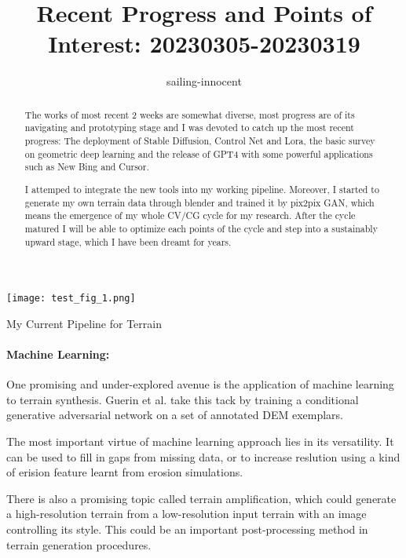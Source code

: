 \documentclass[sigconf]{acmart/acmart}
\begin{document}
\title{Recent Progress and Points of Interest: 20230305-20230319}
\author{sailing-innocent}


\begin{abstract}
    The works of most recent 2 weeks are somewhat diverse,
    most progress are of its navigating and prototyping stage and
    I was devoted to catch up the most recent progress:
    The deployment of Stable Diffusion, Control Net and Lora,
    the basic survey on geometric deep learning and
    the release of GPT4 with some powerful applications
    such as New Bing and Cursor.

    I attemped to integrate the new tools into my working pipeline.
    Moreover, I started to generate my own terrain data through blender
    and trained it by pix2pix GAN, which means the emergence of my whole
    CV/CG cycle for my research.
    After the cycle matured I will be able to optimize each points
    of the cycle and step into a sustainably upward stage,
    which I have been dreamt for years.
\end{abstract}

\begin{teaserfigure}
    \texttt{[image: test\_fig\_1.png]}
    \caption{My Current Pipeline for Terrain }
    \label{fig:teaser}
\end{teaserfigure}

\maketitle

\paragraph{Machine Learning:}

One promising and under-explored avenue is the application of machine learning
to terrain synthesis. Guerin et al. take this tack by training a conditional generative adversarial network
on a set of annotated DEM exemplars.

The most important virtue of machine learning approach lies in its versatility.
It can be used to fill in gaps from missing data, or to increase reslution using a kind of erision feature learnt from erosion simulations.

There is also a promising topic called
terrain amplification,
which could generate a high-resolution
terrain from a low-resolution input terrain with an image controlling its style.
This could be an important post-processing method in terrain generation procedures.


\end{document}
